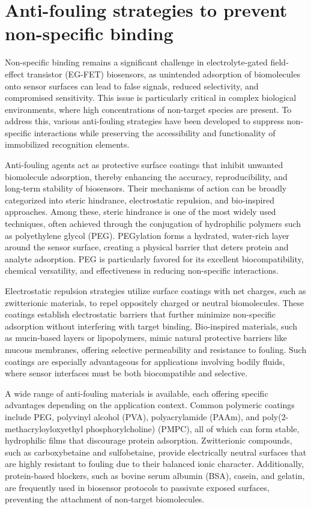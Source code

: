 \section{Anti-fouling strategies to prevent non-specific binding}

Non-specific binding remains a significant challenge in electrolyte-gated field-effect transistor (EG-FET) biosensors, as unintended adsorption of biomolecules onto sensor surfaces can lead to false signals, reduced selectivity, and compromised sensitivity. This issue is particularly critical in complex biological environments, where high concentrations of non-target species are present. To address this, various anti-fouling strategies have been developed to suppress non-specific interactions while preserving the accessibility and functionality of immobilized recognition elements.

Anti-fouling agents act as protective surface coatings that inhibit unwanted biomolecule adsorption, thereby enhancing the accuracy, reproducibility, and long-term stability of biosensors. Their mechanisms of action can be broadly categorized into steric hindrance, electrostatic repulsion, and bio-inspired approaches. Among these, steric hindrance is one of the most widely used techniques, often achieved through the conjugation of hydrophilic polymers such as polyethylene glycol (PEG). PEGylation forms a hydrated, water-rich layer around the sensor surface, creating a physical barrier that deters protein and analyte adsorption. PEG is particularly favored for its excellent biocompatibility, chemical versatility, and effectiveness in reducing non-specific interactions.

Electrostatic repulsion strategies utilize surface coatings with net charges, such as zwitterionic materials, to repel oppositely charged or neutral biomolecules. These coatings establish electrostatic barriers that further minimize non-specific adsorption without interfering with target binding. Bio-inspired materials, such as mucin-based layers or lipopolymers, mimic natural protective barriers like mucous membranes, offering selective permeability and resistance to fouling. Such coatings are especially advantageous for applications involving bodily fluids, where sensor interfaces must be both biocompatible and selective.

A wide range of anti-fouling materials is available, each offering specific advantages depending on the application context. Common polymeric coatings include PEG, polyvinyl alcohol (PVA), polyacrylamide (PAAm), and poly(2-methacryloyloxyethyl phosphorylcholine) (PMPC), all of which can form stable, hydrophilic films that discourage protein adsorption. Zwitterionic compounds, such as carboxybetaine and sulfobetaine, provide electrically neutral surfaces that are highly resistant to fouling due to their balanced ionic character. Additionally, protein-based blockers, such as bovine serum albumin (BSA), casein, and gelatin, are frequently used in biosensor protocols to passivate exposed surfaces, preventing the attachment of non-target biomolecules.


